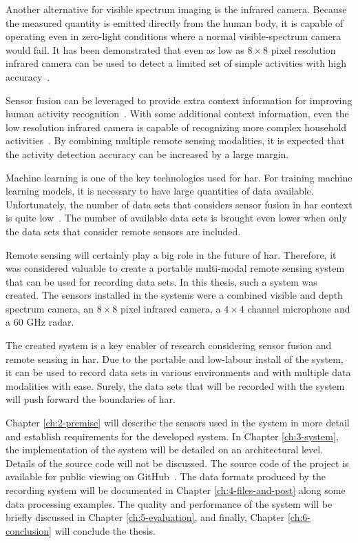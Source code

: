 Another alternative for visible spectrum imaging is the infrared camera.
Because the measured quantity is emitted directly from the human body,
it is capable of operating even in zero-light conditions where a normal visible-spectrum camera would fail.
It has been demonstrated that even as low as $8 \times 8$ pixel resolution infrared camera can be used
to detect a limited set of simple activities with high accuracy~\cite{ir-simple-activities}.

Sensor fusion can be leveraged to provide extra context information for improving human activity recognition~\cite{fusion1, fusion2}.
With some additional context information,
even the low resolution infrared camera is capable of recognizing more complex household activities~\cite{ir-household}.
By combining multiple remote sensing modalities,
it is expected that the activity detection accuracy can be increased by a large margin.

Machine learning is one of the key technologies used for \gls{har}.
For training machine learning models, it is necessary to have large quantities of data available.
Unfortunately, the number of data sets that considers sensor fusion in \gls{har} context is quite low~\cite{sensing-survey}.
The number of available data sets is brought even lower when only the data sets that consider remote sensors are included.

Remote sensing will certainly play a big role in the future of \gls{har}.
Therefore, it was considered valuable to create a portable multi-modal remote sensing system that can be used for recording data sets.
In this thesis, such a system was created.
The sensors installed in the systems were a combined visible and depth spectrum camera,
an $8 \times 8$ pixel infrared camera, a $4 \times 4$ channel microphone and a 60 GHz radar.

The created system is a key enabler of research considering sensor fusion and remote sensing in \gls{har}.
Due to the portable and low-labour install of the system,
it can be used to record data sets in various environments and with multiple data modalities with ease.
Surely, the data sets that will be recorded with the system will push forward the boundaries of \gls{har}.

Chapter \ref{ch:2-premise} will describe the sensors used in the system in more detail and establish requirements for the developed system.
In Chapter \ref{ch:3-system}, the implementation of the system will be detailed on an architectural level.
Details of the source code will not be discussed. The source code of the project is available for public viewing on GitHub~\cite{github-link}.
The data formats produced by the recording system will be documented in Chapter \ref{ch:4-files-and-post} along some data processing examples.
The quality and performance of the system will be briefly discussed in Chapter \ref{ch:5-evaluation},
and finally, Chapter \ref{ch:6-conclusion} will conclude the thesis.